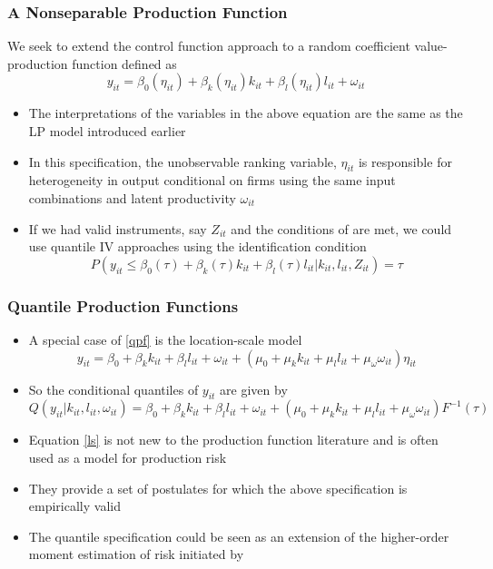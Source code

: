 \documentclass{beamer}
\begin{document}

\begin{frame}
\frametitle{A Nonseparable Production Function}
We seek to extend the control function approach to a random coefficient value-production function defined as
\begin{equation} \label{qpf}
	y_{it}=\beta_{0}(\eta_{it})+\beta_{k}(\eta_{it})k_{it}+\beta_{l}(\eta_{it})l_{it}+\omega_{it}
\end{equation}
\begin{itemize}
	\item The interpretations of the variables in the above equation are the same as the LP model introduced earlier
	\item In this specification, the unobservable ranking variable, $\eta_{it}$ is responsible for heterogeneity in output conditional on firms using the same input combinations and latent productivity $\omega_{it}$
	\item If we had valid instruments, say $Z_{it}$ and the conditions of \textcite{Chernozhukov2005} are met, we could use quantile IV approaches using the identification condition
	\begin{equation}
	P(y_{it}\leq\beta_{0}(\tau)+\beta_{k}(\tau)k_{it}+\beta_{l}(\tau)l_{it}|k_{it}, l_{it}, Z_{it})=\tau
	\end{equation}
\end{itemize}
\end{frame}


\begin{frame}
\frametitle{Quantile Production Functions}
\begin{itemize}
	\item A special case of \eqref{qpf} is the location-scale model
	\small
	\begin{equation} \label{ls}
	y_{it}=\beta_{0}+\beta_{k}k_{it}+\beta_{l}l_{it}+\omega_{it}+(\mu_{0}+\mu_{k}k_{it}+\mu_{l}l_{it}+\mu_{\omega}\omega_{it})\eta_{it}
	\end{equation}
	\normalsize
	\item So the conditional quantiles of $y_{it}$ are given by
	\small
	\begin{equation}
	Q(y_{it}|k_{it}, l_{it}, \omega_{it})=\beta_{0}+\beta_{k}k_{it}+\beta_{l}l_{it}+\omega_{it}+(\mu_{0}+\mu_{k}k_{it}+\mu_{l}l_{it}+\mu_{\omega}\omega_{it})F^{-1}(\tau)
	\end{equation}
	\normalsize
	\item Equation \eqref{ls} is not new to the production function literature and is often used as a model for production risk \parencite{Just1978}
	\item They provide a set of postulates for which the above specification is empirically valid
	\item The quantile specification could be seen as an extension of the higher-order moment estimation of risk initiated by \textcite{Antle1983}
\end{itemize}
\end{frame}
\end{document}
